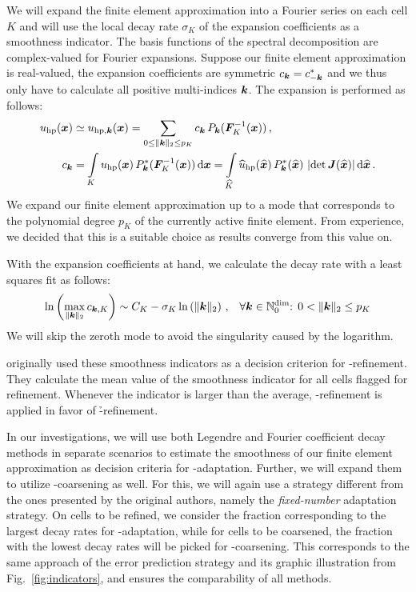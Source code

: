 We will expand the finite element approximation into a Fourier series on each cell $K$ and will use the local decay rate $\sigma_K$ of the expansion coefficients as a smoothness indicator. The basis functions of the spectral decomposition are complex-valued for Fourier expansions. Suppose our finite element approximation is real-valued, the expansion coefficients are symmetric $c_\tuple{k} = c_{-\tuple{k}}^*$ and we thus only have to calculate all positive multi-indices $\tuple{k}$. The expansion is performed as follows:
\begin{align}
u_{\text{hp}}(\vec{x}) &\simeq u_{\text{hp}, \tuple{k}}(\vec{x}) = \sum\limits_{0 \leq \|\tuple{k}\|_2 \leq p_K} c_\tuple{k} \, P_\tuple{k}(\mat{F}_K^{-1}(\vec{x})) \,\text{,} \\
c_\tuple{k} &=
\int\limits_K u_{\text{hp}}(\vec{x}) \, P_\tuple{k}^\ast(\mat{F}_K^{-1}(\vec{x})) \differential{\vec{x}} =
\int\limits_{\widehat{K}} \widehat{u}_{\text{hp}}(\vec{\widehat{x}}) \, P_\tuple{k}^\ast(\vec{\widehat{x}}) \, \left|\det \mat{J}(\vec{\widehat{x}})\right| \differential{\vec{\widehat{x}}} \,\text{.}
\end{align}
We expand our finite element approximation up to a mode that corresponds to the polynomial degree $p_K$ of the currently active finite element. From experience, we decided that this is a suitable choice as results converge from this value on. \textcite{dealiifourier}

With the expansion coefficients at hand, we calculate the decay rate with a least squares fit as follows:
\begin{align}
\ln\left( \max\limits_{\|\tuple{k}\|_2} c_{\tuple{k}, K} \right) \sim C_K - \sigma_K  \ln\left( \|\tuple{k}\|_2 \right) \,\text{,} \quad \forall \tuple{k} \in \mathbb{N}_0^\text{dim} \text{: } 0 < \|\tuple{k}\|_2 \leq p_K
\end{align}
We will skip the zeroth mode to avoid the singularity caused by the logarithm.

\textcite{bangerth2009} originally used these smoothness indicators as a decision criterion for \hp-refinement. They calculate the mean value of the smoothness indicator for all cells flagged for refinement. Whenever the indicator is larger than the average, \p-refinement is applied in favor of \h-refinement.

In our investigations, we will use both Legendre and Fourier coefficient decay methods in separate scenarios to estimate the smoothness of our finite element approximation as decision criteria for \hp-adaptation. Further, we will expand them to utilize \hp-coarsening as well. For this, we will again use a strategy different from the ones presented by the original authors, namely the \textit{fixed-number} adaptation strategy. On cells to be refined, we consider the fraction corresponding to the largest decay rates for \p-adaptation, while for cells to be coarsened, the fraction with the lowest decay rates will be picked for \p-coarsening. This corresponds to the same approach of the error prediction strategy and its graphic illustration from Fig.~\ref{fig:indicators}, and ensures the comparability of all methods.


